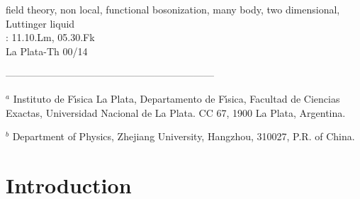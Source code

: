 \documentclass[a4paper,a4paper]{article}
\begin{document}
\vspace{3cm}  field theory, non local, functional
bosonization, many body, two dimensional, Luttinger liquid\\ :
11.10.Lm, 05.30.Fk\\ La Plata-Th 00/14

\noindent ---------------------------------------------------------------

\noindent $^a$ {\footnotesize Instituto de F\'{\i}sica La Plata, Departamento de
F\'{\i}sica, Facultad de Ciencias Exactas, Universidad Nacional de La Plata.  CC 67,
1900 La Plata, Argentina.}

\noindent $^b$ {\footnotesize Department of Physics, Zhejiang University, Hangzhou,
310027, P.R. of China.}


\newpage

\pagestyle{plain}


\section{Introduction}
\end{document}
